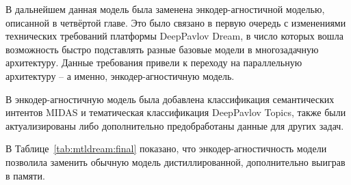 В дальнейшем данная модель была заменена энкодер-агностичной моделью, описанной в четвёртой главе. Это было связано в первую очередь с изменениями технических требований платформы DeepPavlov Dream, в число которых вошла возможность быстро подставлять разные базовые модели в многозадачную архитектуру. Данные требования привели к переходу на параллельную архитектуру -- а именно, энкодер-агностичную модель.


В энкодер-агностичную модель была добавлена классификация семантических интентов MIDAS и тематическая классификация DeepPavlov Topics, также были актуализированы либо дополнительно предобработаны данные для других задач.

В Таблице~\ref{tab:mtldream:final} показано, что энкодер-агностичность модели позволила заменить обычную модель дистиллированной, дополнительно выиграв в памяти.


